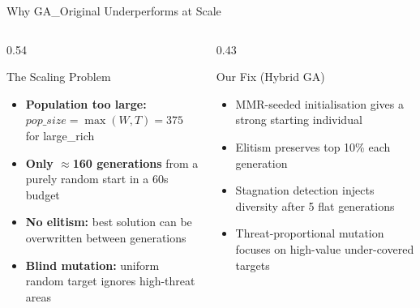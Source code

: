 \documentclass[aspectratio=169,10pt]{beamer}
\begin{document}
\begin{frame}{Why GA\_Original Underperforms at Scale}
  \begin{columns}[T]
    \begin{column}{0.54\textwidth}
      \begin{alertblock}{The Scaling Problem}
        {\small
        \begin{itemize}\itemsep4pt
          \item[\color{white}$\bullet$] \textbf{Population too large:}
            $\textit{pop\_size} = \max(W,T) = 375$ for large\_rich
          \item[\color{white}$\bullet$] \textbf{Only $\approx$160 generations}
            from a purely random start in a 60s budget
          \item[\color{white}$\bullet$] \textbf{No elitism:}
            best solution can be overwritten between generations
          \item[\color{white}$\bullet$] \textbf{Blind mutation:}
            uniform random target ignores high-threat areas
        \end{itemize}
        }
      \end{alertblock}
    \end{column}
    \begin{column}{0.43\textwidth}
      \begin{block}{Our Fix (Hybrid GA)}
        {\small
        \begin{itemize}\itemsep4pt
          \item[\color{goldaccent}$\checkmark$] MMR-seeded initialisation
            gives a strong starting individual
          \item[\color{goldaccent}$\checkmark$] Elitism preserves top 10\%
            each generation
          \item[\color{goldaccent}$\checkmark$] Stagnation detection
            injects diversity after 5 flat generations
          \item[\color{goldaccent}$\checkmark$] Threat-proportional mutation
            focuses on high-value under-covered targets
        \end{itemize}
        }
      \end{block}
    \end{column}
  \end{columns}
\end{frame}
\end{document}
